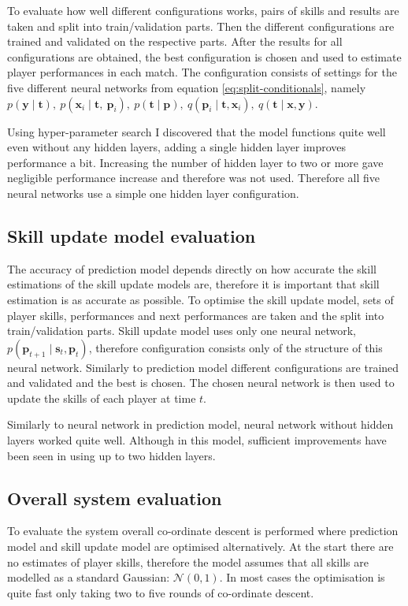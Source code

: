 \documentclass[12pt,a4paper]{book}
\newcommand\bs[1]{\boldsymbol{#1}}
\begin{document}
To evaluate how well different configurations works, pairs of skills and results are taken and split into train/validation parts.
Then the different configurations are trained and validated on the respective parts.
After the results for all configurations are obtained, the best configuration is chosen and used to estimate player performances in each match.
The configuration consists of settings for the five different neural networks from equation \ref{eq:split-conditionals}, namely 
$p(\bs{y}\mid\bs{t}),\ p(\bs{x}_i \mid \bs{t},\ \bs{p}_i),\ p(\bs{t} \mid \bs{p}),\ q(\bs{p}_i \mid \bs{t},\bs{x}_i),\ q(\bs{t}\mid\bs{x},\bs{y})$.

Using hyper-parameter search I discovered that the model functions quite well even without any hidden layers, adding a single hidden layer improves performance a bit.
Increasing the number of hidden layer to two or more gave negligible performance increase and therefore was not used.
Therefore all five neural networks use a simple one hidden layer configuration.
\subsection{Skill update model evaluation}
The accuracy of prediction model depends directly on how accurate the skill estimations of the skill update models are, therefore it is important that skill estimation is as accurate as possible.
To optimise the skill update model, sets of player skills, performances and next performances are taken and the split into train/validation parts.
Skill update model uses only one neural network, $p(\bs{p}_{t+1}\mid\bs{s}_t,\bs{p}_t)$, therefore configuration consists only of the structure of this neural network.
Similarly to prediction model different configurations are trained and validated and the best is chosen.
The chosen neural network is then used to update the skills of each player at time $t$.

Similarly to neural network in prediction model, neural network without hidden layers worked quite well.
Although in this model, sufficient improvements have been seen in using up to two hidden layers.

\subsection{Overall system evaluation}
To evaluate the system overall co-ordinate descent is performed where prediction model and skill update model are optimised alternatively.
At the start there are no estimates of player skills, therefore the model assumes that all skills are modelled as a standard Gaussian: $\mathcal{N}(0,1)$.
In most cases the optimisation is quite fast only taking two to five rounds of co-ordinate descent.
\end{document}
